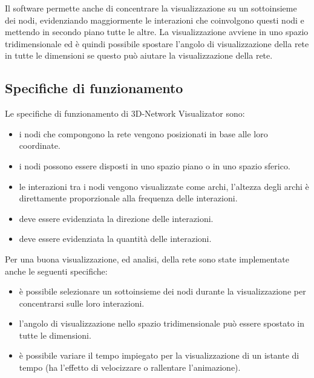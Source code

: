 \documentclass[a4paper,12pt]{article}
\begin{document}
Il software permette anche di concentrare la visualizzazione su un sottoinsieme dei nodi, evidenziando maggiormente le interazioni che coinvolgono questi nodi e mettendo in secondo piano tutte le altre. La visualizzazione avviene in uno spazio tridimensionale ed \`e quindi possibile spostare l'angolo di visualizzazione della rete in tutte le dimensioni se questo pu\`o aiutare la visualizzazione della rete.

\subsection{Specifiche di funzionamento}
Le specifiche di funzionamento di 3D-Network Visualizator sono:
\begin{itemize}
 \item i nodi che compongono la rete vengono posizionati in base alle loro coordinate.
 \item i nodi possono essere disposti in uno spazio piano o in uno spazio sferico.
 \item le interazioni tra i nodi vengono visualizzate come archi, l'altezza degli archi \`e direttamente proporzionale alla frequenza delle interazioni.
 \item deve essere evidenziata la direzione delle interazioni.
 \item deve essere evidenziata la quantit\`a delle interazioni.
\end{itemize}

Per una buona visualizzazione, ed analisi, della rete sono state implementate anche le seguenti specifiche:
\begin{itemize}
 \item \`e possibile selezionare un sottoinsieme dei nodi durante la visualizzazione per concentrarsi sulle loro interazioni.
 \item l'angolo di visualizzazione nello spazio tridimensionale pu\`o essere spostato in tutte le dimensioni.
 \item \`e possibile variare il tempo impiegato per la visualizzazione di un istante di tempo (ha l'effetto di velocizzare o rallentare l'animazione).
\end{itemize}
\end{document}
